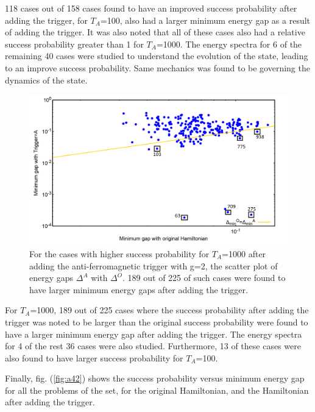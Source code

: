 \documentclass[../main.tex]{subfiles}
\begin{document}
118 cases out of 158 cases found to have an improved success probability after adding the trigger, for $T_A$=100, also had a larger minimum energy gap as a result of adding the trigger. It was also noted that all of these cases also had a  relative success probability greater than 1 for $T_A$=1000. The energy spectra for 6 of the remaining 40 cases were studied to understand the evolution of the state, leading to an improve success probability. Same mechanics was found to be governing the dynamics of the state.
\begin{figure}[H]
\centering 
\includegraphics[scale=0.35]{selected_T1000_g2.png}
\caption{For the cases with higher success probability for $T_A$=1000 after adding the anti-ferromagnetic trigger with g=2, the scatter plot of energy gaps $\Delta^A $ with $\Delta^O$. 189 out of 225 of such cases were found to have larger minimum energy gaps after adding the trigger.}
\label{fig:a41}
\end{figure}
For $T_A$=1000, 189 out of 225 cases where the success probability after adding the trigger was noted to be larger than the original success probability were found to have a larger minimum energy gap after adding the trigger. The energy spectra for 4 of the rest 36 cases were also studied. Furthermore, 13 of these cases were also found to have larger success probability for $T_A$=100.


Finally, fig. (\ref{fig:a42}) shows the success probability versus minimum energy gap for all the problems of the set, for the original Hamiltonian, and the Hamiltonian after adding the trigger. 
\end{document}
